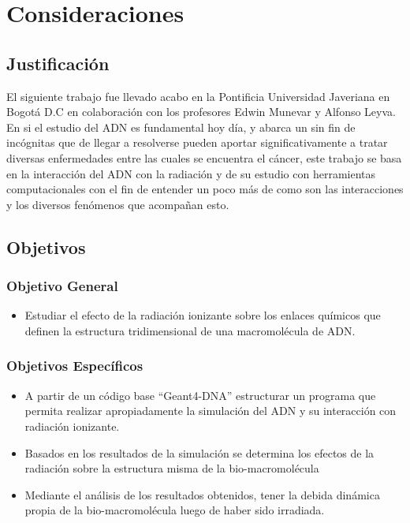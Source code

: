 \clearpage
\section{Consideraciones}

\subsection{Justificación}
\label{sec:Intro}
El siguiente trabajo fue llevado acabo en la Pontificia Universidad Javeriana en Bogotá D.C en colaboración con los profesores Edwin Munevar y Alfonso Leyva. En si el estudio del ADN es fundamental hoy día, y abarca un sin fin de incógnitas que de llegar a resolverse pueden aportar significativamente a tratar diversas enfermedades entre las cuales se encuentra el cáncer, este trabajo se basa en la interacción del ADN con la radiación y de su estudio con herramientas computacionales con el fin de entender un poco más de como son las interacciones y los diversos fenómenos que acompañan esto.
\subsection{Objetivos}
\subsubsection{Objetivo General}
\begin{itemize}
  \item Estudiar el efecto de la radiación ionizante sobre los enlaces químicos que definen la estructura tridimensional de una macromolécula de ADN.
\end{itemize}
\subsubsection{Objetivos Específicos}
\begin{itemize}
  \item A partir de un código base “Geant4-DNA” estructurar un programa que permita realizar apropiadamente la simulación del ADN y su interacción con radiación ionizante.
  \item Basados en los resultados de la simulación se determina los efectos de la radiación sobre la estructura misma de la bio-macromolécula
  \item Mediante el análisis de los resultados obtenidos, tener la debida dinámica propia de la bio-macromolécula luego de haber sido irradiada.
\end{itemize}
